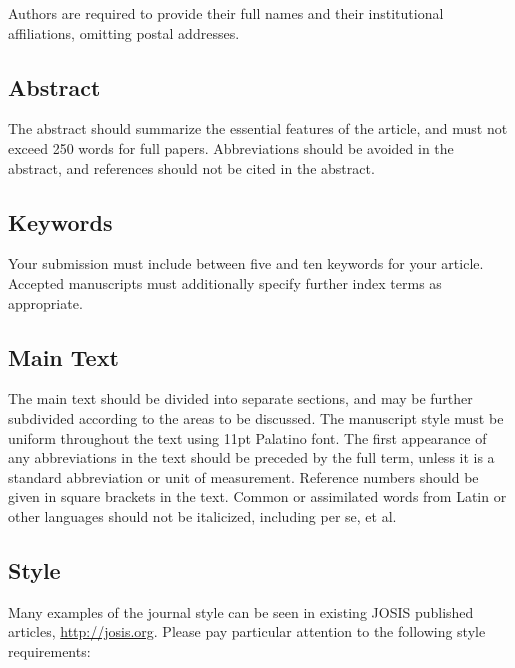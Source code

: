 \documentclass{josis}
\begin{document}
Authors are required to provide their full names and their institutional
affiliations, omitting postal addresses.

\subsection{Abstract}

The abstract should summarize the essential features of the article, and
must not exceed 250 words for full papers. Abbreviations should be
avoided in the abstract, and references should not be cited in the
abstract.

\subsection{Keywords}

Your submission must include between five and ten keywords for your
article. Accepted manuscripts must additionally specify further index
terms as appropriate.

\subsection{Main Text}

The main text should be divided into separate sections, and may be
further subdivided according to the areas to be discussed. The
manuscript style must be uniform throughout the text using 11pt Palatino
font. The first appearance of any abbreviations in the text should be
preceded by the full term, unless it is a standard abbreviation or unit
of measurement. Reference numbers should be given in square brackets in
the text. Common or assimilated words from Latin or other languages
should not be italicized, including per se, et al.

\subsection{Style}

Many examples of the journal style can be seen in existing JOSIS
published articles, \url{http://josis.org}. Please pay particular
attention to the following style requirements:
\end{document}

